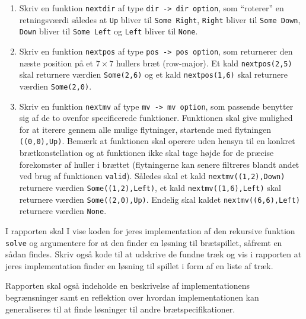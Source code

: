 \begin{enumerate}
\item Skriv en funktion \lstinline{nextdir} af type \lstinline{dir -> dir option}, som ``roterer'' en retningsværdi således at \lstinline{Up} bliver til \lstinline{Some Right}, \lstinline{Right} bliver til \lstinline{Some Down}, \lstinline{Down} bliver til \lstinline{Some Left} og \lstinline{Left} bliver til \lstinline{None}.

\item Skriv en funktion \lstinline{nextpos} af type \lstinline{pos -> pos option}, som returnerer den næste position på et $7 \times 7$ hullers bræt (row-major). Et kald \lstinline{nextpos(2,5)} skal returnere værdien \lstinline{Some(2,6)} og et kald \lstinline{nextpos(1,6)} skal returnere værdien \lstinline{Some(2,0)}.

\item Skriv en funktion \lstinline{nextmv} af type \lstinline{mv -> mv option}, som passende benytter sig af de to ovenfor specificerede funktioner. Funktionen skal give mulighed for at iterere gennem alle mulige flytninger, startende med flytningen \lstinline{((0,0),Up)}. Bemærk at funktionen skal operere uden hensyn til en konkret brætkonstellation og at funktionen ikke skal tage højde for de præcise forekomster af huller i brættet (flytningerne kan senere filtreres blandt andet ved brug af funktionen \lstinline{valid}).
%
Således skal et kald \lstinline{nextmv((1,2),Down)} returnere værdien \lstinline{Some((1,2),Left)}, et kald \lstinline{nextmv((1,6),Left)} skal returnere værdien \lstinline{Some((2,0),Up)}. Endelig skal kaldet \lstinline{nextmv((6,6),Left)} returnere værdien \lstinline{None}.
\end{enumerate}

I rapporten skal I vise koden for jeres implementation af den rekursive funktion \lstinline{solve} og argumentere for at den finder en løsning til brætspillet, såfremt en sådan findes. Skriv også kode til at udskrive de fundne træk og vis i rapporten at jeres implementation finder en løsning til spillet i form af en liste af træk.

Rapporten skal også indeholde en beskrivelse af implementationens begrænsninger samt en reflektion over hvordan implementationen kan generaliseres til at finde løsninger til andre brætspecifikationer.
